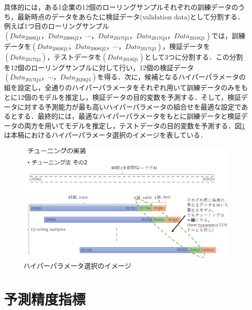 \documentclass[a4paper，12pt]{jsarticle}
\begin{document}
具体的には，ある1企業の12個のローリングサンプルそれぞれの訓練データのうち，最新時点のデータをあらたに検証データ(validation data)として分割する．例えば1つ目のローリングサンプル$(Data_{\text{2008Q1}}，Data_{\text{2008Q2}}，\cdots，Data_{\text{2017Q3}}，Data_{\text{2017Q4}}，Data_{\text{2018Q1}})$では，訓練データを$(Data_{\text{2008Q1}}，Data_{\text{2008Q2}}，\cdots，Data_{\text{2017Q3}})$，検証データを$(Data_{\text{2017Q4}})$，テストデータを$(Data_{\text{2018Q1}})$として3つに分割する．この分割を12個のローリングサンプルに対して行い，12個の検証データ$(Data_{\text{2017Q4}}，\cdots ，Data_{2020Q3})$を得る．次に，候補となるハイパーパラメータの組を設定し，全通りのハイパーパラメータをそれぞれ用いて訓練データのみをもとに12個のモデルを推定し，検証データの目的変数を予測する．そして，検証データに対する予測能力が最も高いハイパーパラメータの組合せを最適な設定であるとする．最終的には，最適なハイパーパラメータをもとに訓練データと検証データの両方を用いてモデルを推定し，テストデータの目的変数を予測する．図\ref{fig:hyparam_selection}は本稿におけるハイパーパラメータ選択のイメージを表している．


\begin{figure}
  \centering
  \caption{ハイパーパラメータ選択のイメージ}
  \label{fig:hyparam_selection}
  \includegraphics[width=12cm]{./img/_rolling_sample_val_i.png}
\end{figure}


\section{予測精度指標}
\end{document}
